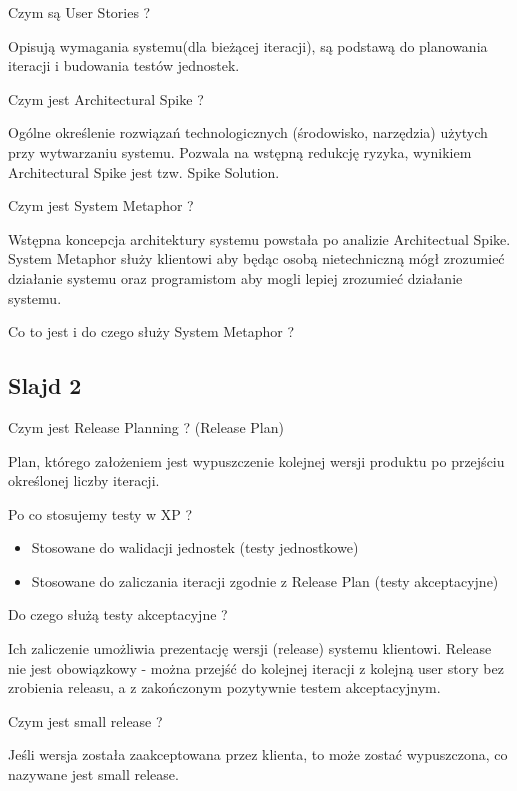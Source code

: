 \documentclass[a4paper,15pt]{article}
\newcommand{\question}[2]{
    \begin{tcolorbox}[colback=mRed!5!white,colframe=mRed,title={Kolokwium 2018 #1}]
        #2
    \end{tcolorbox}
}
\begin{document}
\begin{framed}
Czym są User Stories ?
\end{framed}
Opisują wymagania systemu(dla bieżącej iteracji), są podstawą do planowania iteracji i budowania testów jednostek.

\begin{framed}
Czym jest Architectural Spike ?
\end{framed} 
Ogólne określenie rozwiązań technologicznych (środowisko, narzędzia) użytych przy wytwarzaniu systemu. Pozwala na wstępną redukcję ryzyka, wynikiem Architectural Spike jest tzw. Spike Solution. 

\begin{framed}
Czym jest System Metaphor ?
\end{framed}
Wstępna koncepcja architektury systemu powstała po analizie Architectual Spike. System Metaphor służy klientowi aby będąc osobą nietechniczną mógł zrozumieć działanie systemu oraz programistom aby mogli lepiej zrozumieć działanie systemu.

\question{}{
Co to jest i do czego służy System Metaphor ?
}

\subsection{Slajd 2}
\begin{framed}
Czym jest Release Planning ? (Release Plan)
\end{framed}
Plan, którego założeniem jest wypuszczenie kolejnej wersji produktu po przejściu określonej liczby iteracji.

\begin{framed}
Po co stosujemy testy w XP ?
\end{framed}
\begin{itemize}
\item Stosowane do walidacji jednostek (testy jednostkowe)
\item Stosowane do zaliczania iteracji zgodnie z Release Plan (testy akceptacyjne)
\end{itemize}


\begin{framed}
Do czego służą testy akceptacyjne ?
\end{framed}
Ich zaliczenie umożliwia prezentację wersji (release) systemu klientowi. Release nie jest obowiązkowy - można przejść do kolejnej iteracji z kolejną user story bez zrobienia releasu, a z zakończonym pozytywnie testem akceptacyjnym.

\begin{framed}
Czym jest small release ?
\end{framed}
Jeśli wersja została zaakceptowana przez klienta, to może zostać wypuszczona, co nazywane jest small release.
\end{document}
